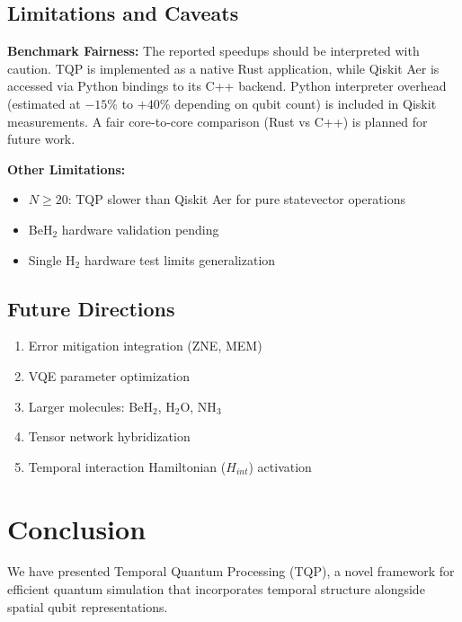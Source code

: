 \documentclass[aps,prx,twocolumn,superscriptaddress,floatfix]{revtex4-2}
\begin{document}
\subsection{Limitations and Caveats}

\textbf{Benchmark Fairness:} The reported speedups should be interpreted with caution. TQP is implemented as a native Rust application, while Qiskit Aer is accessed via Python bindings to its C++ backend. Python interpreter overhead (estimated at $-15$\% to $+40$\% depending on qubit count) is included in Qiskit measurements. A fair core-to-core comparison (Rust vs C++) is planned for future work.

\textbf{Other Limitations:}
\begin{itemize}
    \item $N \ge 20$: TQP slower than Qiskit Aer for pure statevector operations
    \item BeH$_2$ hardware validation pending
    \item Single H$_2$ hardware test limits generalization
\end{itemize}

\subsection{Future Directions}

\begin{enumerate}
    \item Error mitigation integration (ZNE, MEM)
    \item VQE parameter optimization
    \item Larger molecules: BeH$_2$, H$_2$O, NH$_3$~\cite{nam2020water,hempel2018quantum}
    \item Tensor network hybridization
    \item Temporal interaction Hamiltonian ($H_{int}$) activation
\end{enumerate}

\section{Conclusion}

We have presented Temporal Quantum Processing (TQP), a novel framework for efficient quantum simulation that incorporates temporal structure alongside spatial qubit representations.
\end{document}
